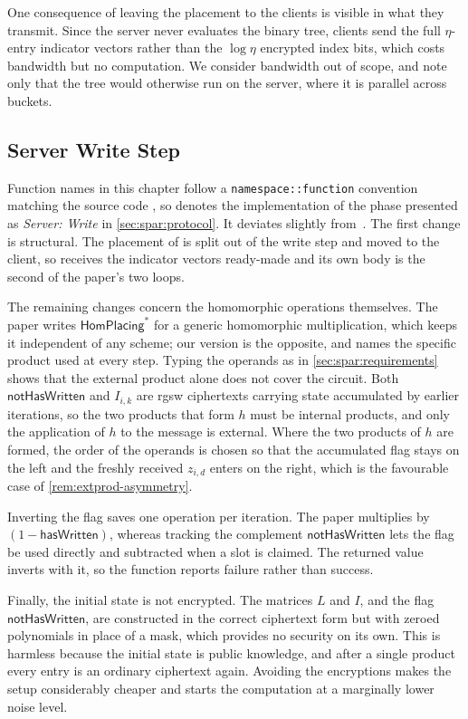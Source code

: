 One consequence of leaving the placement to the clients is visible in what they transmit. Since the server never evaluates the binary tree, clients send the full $\eta$-entry indicator vectors rather than the $\log\eta$ encrypted index bits, which costs bandwidth but no computation. We consider bandwidth out of scope, and note only that the tree would otherwise run on the server, where it is parallel across buckets.

\subsection{Server Write Step}
Function names in this chapter follow a \texttt{namespace::function} convention matching the source code \cite{gitrepo}, so \serverWrite{} denotes the implementation of the phase presented as \emph{Server: Write} in \autoref{sec:spar:protocol}. It deviates slightly from~\cite[Algorithm 2]{cryptoeprint:2025/860}. The first change is structural. The placement of \cite[Algorithm 2]{cryptoeprint:2025/860} is split out of the write step and moved to the client, so \serverWrite{} receives the indicator vectors ready-made and its own body is the second of the paper's two loops.

The remaining changes concern the homomorphic operations themselves. The paper writes $\mathsf{HomPlacing}^*$ for a generic homomorphic multiplication, which keeps it independent of any scheme; our version is the opposite, and names the specific product used at every step. Typing the operands as in \autoref{sec:spar:requirements} shows that the external product alone does not cover the circuit. Both $\mathsf{notHasWritten}$ and $I_{i,k}$ are \gls{rgsw} ciphertexts carrying state accumulated by earlier iterations, so the two products that form $h$ must be internal products, and only the application of $h$ to the message is external. Where the two products of $h$ are formed, the order of the operands is chosen so that the accumulated flag stays on the left and the freshly received $z_{i,d}$ enters on the right, which is the favourable case of \autoref{rem:extprod-asymmetry}.

Inverting the flag saves one operation per iteration. The paper multiplies by $(1 - \mathsf{hasWritten})$, whereas tracking the complement $\mathsf{notHasWritten}$ lets the flag be used directly and subtracted when a slot is claimed. The returned value inverts with it, so the function reports failure rather than success.

Finally, the initial state is not encrypted. The matrices $L$ and $I$, and the flag $\mathsf{notHasWritten}$, are constructed in the correct ciphertext form but with zeroed polynomials in place of a mask, which provides no security on its own. This is harmless because the initial state is public knowledge, and after a single product every entry is an ordinary ciphertext again. Avoiding the encryptions makes the setup considerably cheaper and starts the computation at a marginally lower noise level.

